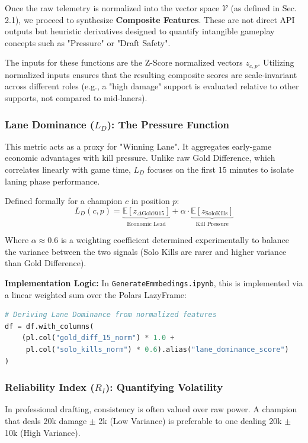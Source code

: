 \documentclass[12pt, a4paper]{article}
\begin{document}
    Once the raw telemetry is normalized into the vector space $\mathcal{V}$ (as defined in Sec. 2.1), we proceed to synthesize \textbf{Composite Features}. These are not direct API outputs but heuristic derivatives designed to quantify intangible gameplay concepts such as "Pressure" or "Draft Safety".

    The inputs for these functions are the Z-Score normalized vectors $z_{c,p}$. Utilizing normalized inputs ensures that the resulting composite scores are scale-invariant across different roles (e.g., a "high damage" support is evaluated relative to other supports, not compared to mid-laners).

    \subsubsection{Lane Dominance ($L_D$): The Pressure Function}
    This metric acts as a proxy for "Winning Lane". It aggregates early-game economic advantages with kill pressure. Unlike raw Gold Difference, which correlates linearly with game time, $L_D$ focuses on the first 15 minutes to isolate laning phase performance.

    Defined formally for a champion $c$ in position $p$:
    \begin{equation}
        L_D(c,p) = \underbrace{\mathbb{E}[z_{\Delta \text{Gold}@15}]}_{\text{Economic Lead}} + \alpha \cdot \underbrace{\mathbb{E}[z_{\text{SoloKills}}]}_{\text{Kill Pressure}}
    \end{equation}

    Where $\alpha \approx 0.6$ is a weighting coefficient determined experimentally to balance the variance between the two signals (Solo Kills are rarer and higher variance than Gold Difference).

    \textbf{Implementation Logic:}
    In \texttt{GenerateEmmbedings.ipynb}, this is implemented via a linear weighted sum over the Polars LazyFrame:

    \begin{lstlisting}[language=Python, caption={Lane Dominance Calculation in Polars}]
# Deriving Lane Dominance from normalized features
df = df.with_columns(
    (pl.col("gold_diff_15_norm") * 1.0 +
     pl.col("solo_kills_norm") * 0.6).alias("lane_dominance_score")
)
    \end{lstlisting}

    \subsubsection{Reliability Index ($R_I$): Quantifying Volatility}
    In professional drafting, consistency is often valued over raw power. A champion that deals 20k damage $\pm$ 2k (Low Variance) is preferable to one dealing 20k $\pm$ 10k (High Variance).
\end{document}
